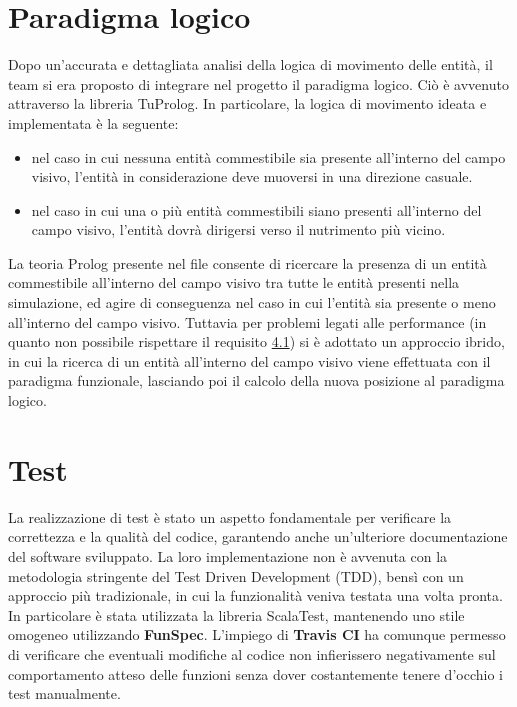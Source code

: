 \section{Paradigma logico}
Dopo un'accurata e dettagliata analisi della logica di movimento delle entità, il team si era proposto di integrare nel progetto il paradigma logico. Ciò è avvenuto attraverso la libreria TuProlog. In particolare, la logica di movimento ideata e implementata è la seguente:
\begin{itemize}
    \item nel caso in cui nessuna entità commestibile sia presente all'interno del campo visivo, l'entità in considerazione deve muoversi in una direzione casuale.
    \item nel caso in cui una o più entità commestibili siano presenti all'interno del campo visivo, l'entità dovrà dirigersi verso il nutrimento più vicino.
\end{itemize}
La teoria Prolog presente nel file  consente di ricercare la presenza di un entità commestibile all'interno del campo visivo tra tutte le entità presenti nella simulazione, ed agire di conseguenza nel caso in cui l'entità sia presente o meno all'interno del campo visivo. Tuttavia per problemi legati alle performance (in quanto non possibile rispettare il requisito \hyperref[sec:cpu]{4.1}) si è adottato un approccio ibrido, in cui la ricerca di un entità all'interno del campo visivo viene effettuata con il paradigma funzionale, lasciando poi il calcolo della nuova posizione al paradigma logico.

\section{Test}
La realizzazione di test è stato un aspetto fondamentale per verificare la correttezza e la qualità del codice, garantendo anche un'ulteriore documentazione del software sviluppato. La loro implementazione non è avvenuta con la metodologia stringente del Test Driven Development (TDD), bensì con un approccio più tradizionale, in cui la funzionalità veniva testata una volta pronta. In particolare è stata utilizzata la libreria ScalaTest, mantenendo uno stile omogeneo utilizzando \textbf{FunSpec}. L'impiego di \textbf{Travis CI} ha comunque permesso di verificare che eventuali modifiche al codice non infierissero negativamente sul comportamento atteso delle funzioni senza dover costantemente tenere d'occhio i test manualmente.

